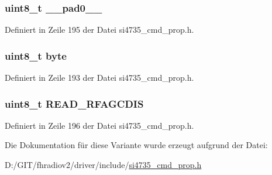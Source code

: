 \subsubsection[{\+\_\+\+\_\+pad0\+\_\+\+\_\+}]{\setlength{\rightskip}{0pt plus 5cm}uint8\+\_\+t \+\_\+\+\_\+pad0\+\_\+\+\_\+}\label{unionfm__agc__status__resp1_a8b4eebe79ded0459acec2f4950102ba3}


Definiert in Zeile 195 der Datei si4735\+\_\+cmd\+\_\+prop.\+h.

\hypertarget{unionfm__agc__status__resp1_a96f44d20f1dbf1c8785a7bc99a46164c}{}
\subsubsection[{byte}]{\setlength{\rightskip}{0pt plus 5cm}uint8\+\_\+t byte}\label{unionfm__agc__status__resp1_a96f44d20f1dbf1c8785a7bc99a46164c}


Definiert in Zeile 193 der Datei si4735\+\_\+cmd\+\_\+prop.\+h.

\hypertarget{unionfm__agc__status__resp1_a9cfeacf28a9e2117d6dab03603563164}{}
\subsubsection[{R\+E\+A\+D\+\_\+\+R\+F\+A\+G\+C\+D\+I\+S}]{\setlength{\rightskip}{0pt plus 5cm}uint8\+\_\+t R\+E\+A\+D\+\_\+\+R\+F\+A\+G\+C\+D\+I\+S}\label{unionfm__agc__status__resp1_a9cfeacf28a9e2117d6dab03603563164}


Definiert in Zeile 196 der Datei si4735\+\_\+cmd\+\_\+prop.\+h.



Die Dokumentation für diese Variante wurde erzeugt aufgrund der Datei\+:\begin{DoxyCompactItemize}
\item 
D\+:/\+G\+I\+T/fhradiov2/driver/include/\hyperlink{si4735__cmd__prop_8h}{si4735\+\_\+cmd\+\_\+prop.\+h}\end{DoxyCompactItemize}
